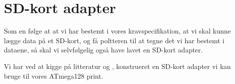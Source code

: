 
\section{SD-kort adapter}
Som en følge at at vi har bestemt i vores kravspecifikation, at vi skal kunne lægge data på et
SD-kort, og få poltteren til at tegne det vi har bestemt i dataene, så
skal vi selvfølgelig også have lavet en SD-kort adapter.

Vi har ved at kigge på litteratur \cite{web:captain-mmc} og
\cite{web:sd-pinout}, konstrueret en SD-kort adapter vi kan bruge til
vores ATmega128 print.



